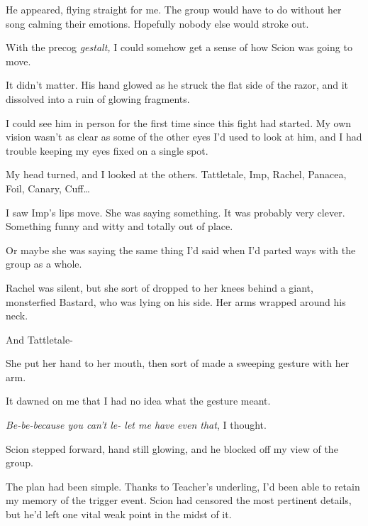 He appeared, flying straight for me.  The group would have to do without her song calming their emotions.  Hopefully nobody else would stroke out.



With the precog \emph{gestalt, }I could somehow get a sense of how Scion was going to move.



It didn't matter.  His hand glowed as he struck the flat side of the razor, and it dissolved into a ruin of glowing fragments.



I could see him in person for the first time since this fight had started.  My own vision wasn't as clear as some of the other eyes I'd used to look at him, and I had trouble keeping my eyes fixed on a single spot.



My head turned, and I looked at the others.  Tattletale, Imp, Rachel, Panacea, Foil, Canary, Cuff\ldots



I saw Imp's lips move.  She was saying something.  It was probably very clever.  Something funny and witty and totally out of place.



Or maybe she was saying the same thing I'd said when I'd parted ways with the group as a whole.



Rachel was silent, but she sort of dropped to her knees behind a giant, monsterfied Bastard, who was lying on his side.  Her arms wrapped around his neck.



And Tattletale-



She put her hand to her mouth, then sort of made a sweeping gesture with her arm.



It dawned on me that I had no idea what the gesture meant.



\emph{Be-be-because you can't le- let me have even that}, I thought.



Scion stepped forward, hand still glowing, and he blocked off my view of the group.



The plan had been simple.  Thanks to Teacher's underling, I'd been able to retain my memory of the trigger event.  Scion had censored the most pertinent details, but he'd left one vital weak point in the midst of it.



